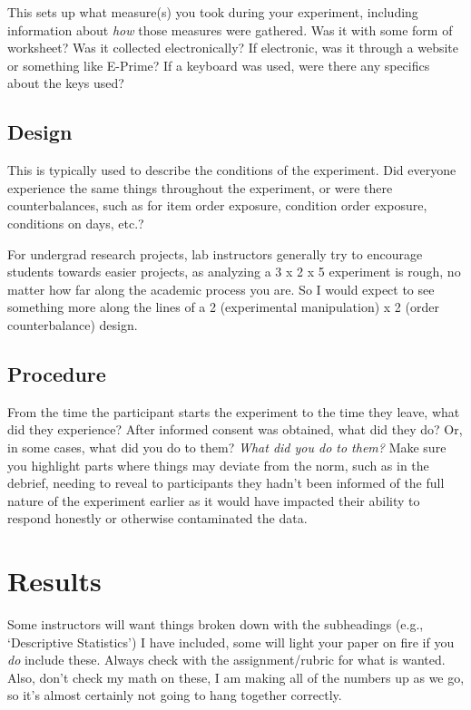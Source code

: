 \documentclass[stu,12pt,floatsintext,justification]{apa7_ula}
\begin{document}
This sets up what measure(s) you took during your experiment, including
information about \textit{how} those measures were gathered. Was it with some
form of worksheet? Was it collected electronically? If electronic, was it
through a website or something like E-Prime? If a keyboard was used, were there
any specifics about the keys used?

\subsection{Design}

This is typically used to describe the conditions of the experiment. Did
everyone experience the same things throughout the experiment, or were there
counterbalances, such as for item order exposure, condition order exposure,
conditions on days, etc.?

For undergrad research projects, lab instructors generally try to encourage
students towards easier projects, as analyzing a 3 x 2 x 5 experiment is rough,
no matter how far along the academic process you are. So I would expect to see
something more along the lines of a 2 (experimental manipulation) x 2 (order
counterbalance) design.

\subsection{Procedure}

From the time the participant starts the experiment to the time they leave,
what did they experience? After informed consent was obtained, what did they
do? Or, in some cases, what did you do to them? \textit{What did you do to
    them?} Make sure you highlight parts where things may deviate from the norm,
such as in the debrief, needing to reveal to participants they hadn't been
informed of the full nature of the experiment earlier as it would have impacted
their ability to respond honestly or otherwise contaminated the data.

\section{Results}

Some instructors will want things broken down with the subheadings (e.g.,
`Descriptive Statistics') I have included, some will light your paper on fire
if you \textit{do} include these. Always check with the assignment/rubric for
what is wanted. Also, don't check my math on these, I am making all of the
numbers up as we go, so it's almost certainly not going to hang together
correctly.
\end{document}
